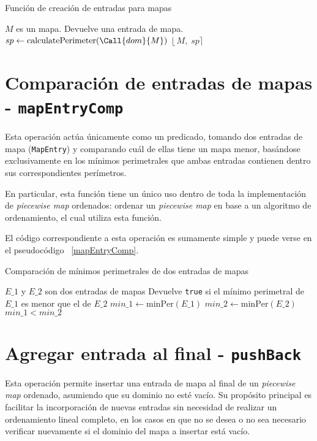 \begin{algorithm}
\caption{Función de creación de entradas para mapas}
\label{alg:createMapEntry}
\begin{algorithmic}[1]
\Require $M$ es un mapa.
\Ensure Devuelve una entrada de mapa.
    \State $sp \gets  \mathrm{calculatePerimeter}(\Call{dom}{M})$
    \State \Return $\lfloor\,M,\;sp\rceil$ 
\EndFunction
\end{algorithmic}
\end{algorithm}

\section*{Comparación de entradas de mapas - \texttt{mapEntryComp}}

Esta operación actúa únicamente como un predicado, tomando dos entradas de mapa (\texttt{MapEntry}) y comparando cuál de ellas tiene un mapa menor, basándose exclusivamente en los mínimos perimetrales que ambas entradas contienen dentro sus correspondientes perímetros.

En particular, esta función tiene un único uso dentro de toda la implementación de \textit{piecewise map} ordenados: ordenar un \textit{piecewise map} en base a un algoritmo de ordenamiento, el cual utiliza esta función.

El código correspondiente a esta operación es sumamente simple y puede verse en el pseudocódigo ~\ref{mapEntryComp}.


\begin{algorithm}
\caption{Comparación de mínimos perimetrales de dos entradas de mapas}
\label{alg:mapEntryComp}
\begin{algorithmic}[1]
\Require $E\_1$ y $E\_2$ son dos entradas de mapas
\Ensure Devuelve \texttt{true} si el mínimo perimetral de $E\_1$ es menor que el de $E\_2$
    \State $min\_1 \gets \mathrm{minPer}(E\_1)$
    \State $min\_2 \gets \mathrm{minPer}(E\_2)$
    \State \Return $min\_1 < min\_2$
\EndFunction
\end{algorithmic}
\end{algorithm}

\section*{Agregar entrada al final - \texttt{pushBack}}

Esta operación permite insertar una entrada de mapa al final de un \textit{piecewise map} ordenado, asumiendo que su dominio no esté vacío. Su propósito principal es facilitar la incorporación de nuevas entradas sin necesidad de realizar un ordenamiento lineal completo, en los casos en que no se desea o no sea necesario verificar nuevamente si el dominio del mapa a insertar está vacío.

